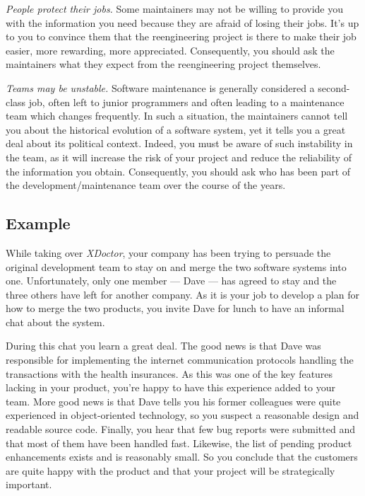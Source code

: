 \documentclass[a4paper,10pt,twoside]{book}
\begin{document}
\begin{bulletlist}
  \item \emph{People protect their jobs.}
Some maintainers may not be willing to provide you with the information you need because they are afraid of losing their jobs. It's up to you to convince them that the reengineering project is there to make their job easier, more rewarding, more appreciated. Consequently, you should ask the maintainers what they expect from the reengineering project themselves.

  \item \emph{Teams may be unstable.}
Software maintenance is generally considered a second-class job, often left to junior programmers and often leading to a maintenance team which changes frequently. In such a situation, the maintainers cannot tell you about the historical evolution of a software system, yet it tells you a great deal about its political context. Indeed, you must be aware of such instability in the team, as it will increase the risk of your project and reduce the reliability of the information you obtain. Consequently, you should ask who has been part of the development/maintenance team over the course of the years.

\end{bulletlist}

\subsection*{Example}

While taking over \emph{XDoctor}, your company has been trying to persuade the original development team to stay on and merge the two software systems into one. Unfortunately, only one member --- Dave --- has agreed to stay and the three others have left for another company. As it is your job to develop a plan for how to merge the two products, you invite Dave for lunch to have an informal chat about the system.

During this chat you learn a great deal. The good news is that Dave was responsible for implementing the internet communication protocols handling the transactions with the health insurances. As this was one of the key features lacking in your product, you're happy to have this experience added to your team. More good news is that Dave tells you his former colleagues were quite experienced in object-oriented technology, so you suspect a reasonable design and readable source code. Finally, you hear that few bug reports were submitted and that most of them have been handled fast. Likewise, the list of pending product enhancements exists and is reasonably small. So you conclude that the customers are quite happy with the product and that your project will be strategically important.
\end{document}
